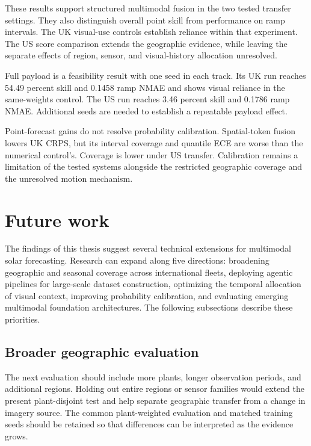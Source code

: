 These results support structured multimodal fusion in the two tested transfer settings. They also distinguish overall point skill from performance on ramp intervals. The UK visual-use controls establish reliance within that experiment. The US score comparison extends the geographic evidence, while leaving the separate effects of region, sensor, and visual-history allocation unresolved.

Full payload is a feasibility result with one seed in each track. Its UK run reaches 54.49 percent skill and 0.1458 ramp NMAE and shows visual reliance in the same-weights control. The US run reaches 3.46 percent skill and 0.1786 ramp NMAE. Additional seeds are needed to establish a repeatable payload effect.

Point-forecast gains do not resolve probability calibration. Spatial-token fusion lowers UK CRPS, but its interval coverage and quantile ECE are worse than the numerical control's. Coverage is lower under US transfer. Calibration remains a limitation of the tested systems alongside the restricted geographic coverage and the unresolved motion mechanism.

\section{Future work}

The findings of this thesis suggest several technical extensions for multimodal solar forecasting. Research can expand along five directions: broadening geographic and seasonal coverage across international fleets, deploying agentic pipelines for large-scale dataset construction, optimizing the temporal allocation of visual context, improving probability calibration, and evaluating emerging multimodal foundation architectures. The following subsections describe these priorities.

\subsection{Broader geographic evaluation}

The next evaluation should include more plants, longer observation periods, and additional regions. Holding out entire regions or sensor families would extend the present plant-disjoint test and help separate geographic transfer from a change in imagery source. The common plant-weighted evaluation and matched training seeds should be retained so that differences can be interpreted as the evidence grows.

